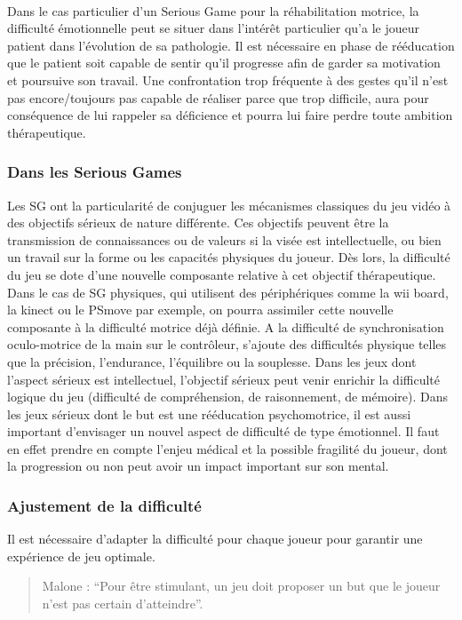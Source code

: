 \paragraph{}Dans le cas particulier d’un Serious Game pour la réhabilitation motrice, la difficulté émotionnelle peut se situer dans l’intérêt particulier qu’a le joueur patient dans l’évolution de sa pathologie. Il est nécessaire en phase de rééducation que le patient soit capable de sentir qu’il progresse afin de garder sa motivation et poursuive son travail. Une confrontation trop fréquente à des gestes qu’il n’est pas encore/toujours pas capable de réaliser parce que trop difficile, aura pour conséquence de lui rappeler sa déficience et pourra lui faire perdre toute ambition thérapeutique.
		
	\subsubsection{Dans les Serious Games}
Les SG ont la particularité de conjuguer les mécanismes classiques du jeu vidéo à des objectifs sérieux de nature différente. Ces objectifs peuvent être la transmission de connaissances ou de valeurs si la visée est intellectuelle, ou bien un travail sur la forme ou les capacités physiques du joueur. Dès lors, la difficulté du jeu se dote d’une nouvelle composante relative à cet objectif thérapeutique.\\
Dans le cas de SG physiques, qui utilisent des périphériques comme la wii board, la kinect ou le PSmove par exemple, on pourra assimiler cette nouvelle composante à la difficulté motrice déjà définie. A la difficulté de synchronisation oculo-motrice de la main sur le contrôleur, s’ajoute des difficultés physique telles que la précision, l’endurance, l’équilibre ou la souplesse.
Dans les jeux dont l’aspect sérieux est intellectuel, l’objectif sérieux peut venir enrichir la difficulté logique du jeu (difficulté de compréhension, de raisonnement, de mémoire).
Dans les jeux sérieux dont le but est une rééducation psychomotrice, il est aussi important d’envisager un nouvel aspect de difficulté de type émotionnel. Il faut en effet prendre en compte l’enjeu médical et la possible fragilité du joueur, dont la progression ou non peut avoir un impact important sur son mental.
		
	\subsubsection{Ajustement de la difficulté}
Il est nécessaire d'adapter la difficulté pour chaque joueur pour garantir une expérience de jeu optimale.			
\begin{quote}Malone : “Pour être stimulant, un jeu doit proposer un but que le joueur n’est pas certain d’atteindre”.
\end{quote}

